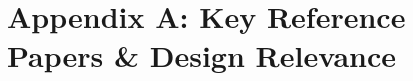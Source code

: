 \documentclass[12pt, a4paper]{article}
\begin{document}
%
%
%



\clearpage
\section*{Appendix A: Key Reference Papers \& Design Relevance}
\end{document}
